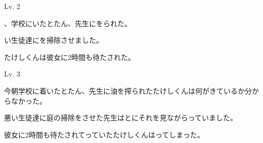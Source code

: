 	\begin{mondai}{Lv. 2}
		\item {}、学校にいたとたん、先生にをられた。
		\item {}い生徒達にを掃除させました。\vspace{7pt}
		\item たけしくんは彼女に2時間も待たされた。
	\end{mondai}

	\begin{mondai}{Lv. 3}
		\item 今朝学校に着いたとたん、先生に油を搾られたたけしくんは何がきているか分からなかった。
		\item 悪い生徒達に庭の掃除をさせた先生はと\hspace{10pt}にそれを見ながらっていました。
		\item 彼女に2時間も待たされてっていたたけしくんは\hspace{15pt}ってしまった。
	\end{mondai}
	
